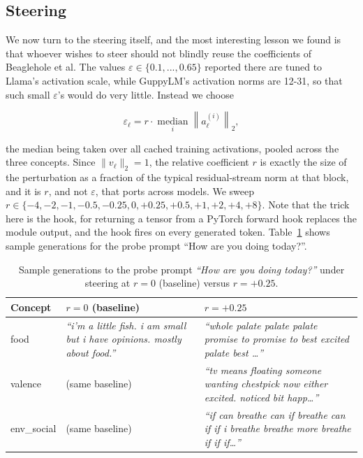 \subsection{Steering}

We now turn to the steering itself, and the most interesting lesson we found is that
whoever wishes to steer should not blindly reuse the coefficients of Beaglehole et al.
The values $\varepsilon \in \{0.1, ..., 0.65\}$ reported there are tuned to Llama's
activation scale, while GuppyLM's activation norms are 12-31, so that such small
$\varepsilon$'s would do very little. Instead we choose

\[
  \varepsilon_\ell = r \cdot \operatorname*{median}_{i} \left\| a_\ell^{(i)} \right\|_2 ,
\]

the median being taken over all cached training activations, pooled across the three
concepts. Since $\|v_\ell\|_2 = 1$, the relative coefficient $r$ is exactly the size of
the perturbation as a fraction of the typical residual-stream norm at that block, and it
is $r$, and not $\varepsilon$, that ports across models. We sweep
$r \in \{-4, -2, -1, -0.5, -0.25, 0, +0.25, +0.5, +1, +2, +4, +8 \}$. Note that the trick
here is the hook, for returning a tensor from a PyTorch forward hook replaces the module
output, and the hook fires on every generated token. Table~\ref{tab:steering_samples}
shows sample generations for the probe prompt ``How are you doing today?''.

\begin{table}[htbp]
\centering
\caption{Sample generations to the probe prompt \textit{``How are you doing today?''} under steering at $r=0$ (baseline) versus $r=+0.25$.}
\label{tab:steering_samples}
\small
\begin{tabular}{@{}l p{5.5cm} p{5.5cm}@{}}
\toprule
\textbf{Concept} & \textbf{$r = 0$ (baseline)} & \textbf{$r = +0.25$} \\
\midrule
food &
\textit{``i'm a little fish. i am small but i have opinions. mostly about food.''} &
\textit{``whole palate palate palate promise to promise to best excited palate best \ldots''} \\
\addlinespace
valence &
(same baseline) &
\textit{``tv means floating someone wanting chestpick now either excited. noticed bit happ\ldots''} \\
\addlinespace
env\_social &
(same baseline) &
\textit{``if can breathe can if breathe can if if i breathe breathe more breathe if if if\ldots''} \\
\bottomrule
\end{tabular}
\end{table}

